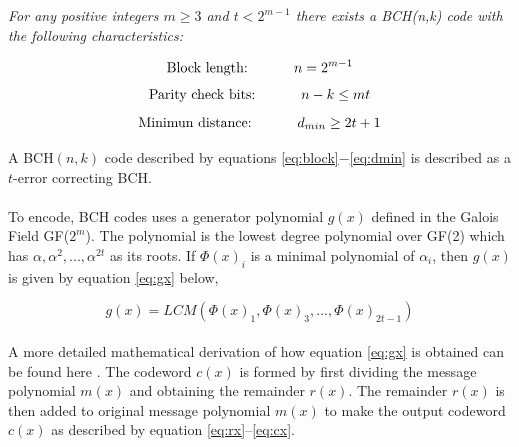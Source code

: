 \documentclass[11pt]{report}
\begin{document}
\begin{center}
\begin{minipage}[h!]{0.85\textwidth}
  	
  	
  	{\it For any positive integers $m\ge3$ and $ t < 2^{m-1} $ there exists a BCH(n,k) code with the following characteristics:}
  	
  	\begin{equation}
  	\label{eq:block}
  	 \mbox{Block length: \hspace{1cm}} n = 2^{m-1}  	
  	\end{equation}
  	\begin{equation}
  	\label{eq:parity}
  	\mbox{Parity check bits: \hspace{1cm}} n -k \le mt 	
  	\end{equation}
  		\begin{equation}
  	\label{eq:dmin}
  	\mbox{Minimun distance: \hspace{1cm}} d_{min} \ge 2t + 1	
  	\end{equation}

\end{minipage}
\end{center}

A BCH$(n,k)$ code described by equations \ref{eq:block}$-$\ref{eq:dmin} is described as a $t$-error correcting BCH.
\\
\\
To encode, BCH codes uses a generator polynomial $g(x)$ defined in the Galois Field GF($2^m$). The polynomial is the lowest degree polynomial over GF(2) which has $\alpha, \alpha^2,...,\alpha^{2t}$ as its roots. If $\Phi(x)_i$ is a minimal polynomial of $\alpha_i$, then $g(x)$ is given by equation \ref{eq:gx} below,

\begin{equation}
\label{eq:gx}
	g(x) = LCM(\Phi(x)_1,\Phi(x)_3,...,\Phi(x)_{2t-1})
\end{equation}
\\
A more detailed mathematical derivation of how equation \ref{eq:gx} is obtained can be found here \cite{B13}. The codeword $c(x)$ is formed by first dividing the message polynomial $m(x)$ and obtaining the remainder $r(x)$. The remainder $r(x)$ is then added to original message polynomial $m(x)$ to make the output codeword $c(x)$ as described by equation \ref{eq:rx}--\ref{eq:cx}.
\end{document}
